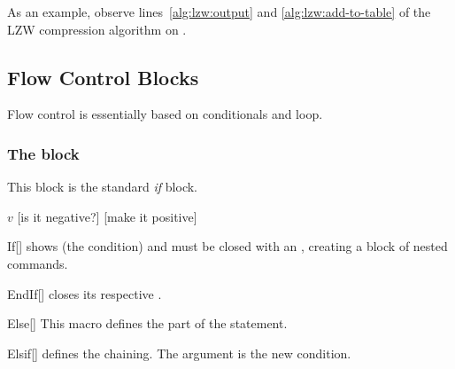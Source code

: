 \documentclass[a4paper, 11pt]{article}
\begin{document}
As an example, observe lines~\ref{alg:lzw:output} and \ref{alg:lzw:add-to-table} of the LZW compression algorithm on .

\subsection{Flow Control Blocks}\label{sec:flow-control-blocks}
Flow control is essentially based on conditionals and loop.

\subsubsection{The  block}
This block is the standard \textit{if} block.

\begin{tcblisting}{}
    \begin{algorithmic}
        \State \Read $v$
        [is it negative?]
            [make it positive]
        \EndIf
    \end{algorithmic}
\end{tcblisting}

\begin{macro}{If}[]
     shows  (the condition) and must be closed with an , creating a block of nested commands.

    \BlockOptionsText
\end{macro}

\begin{macro}{EndIf}[]
     closes its respective .

    \MacroOptionsText
\end{macro}

\begin{macro}{Else}[]
    This macro defines the  part of the  statement.

    \BlockOptionsText
\end{macro}

\begin{macro}{Elsif}[]
     defines the  chaining. The argument  is the new condition.

    \BlockOptionsText
\end{macro}
\end{document}
